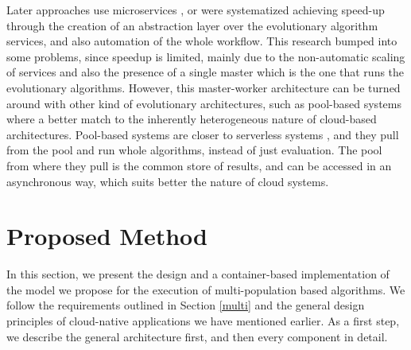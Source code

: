 \documentclass[review]{elsarticle}
\begin{document}
Later approaches use microservices \cite{khalloof2018generic}, or were
systematized \cite{salza2019speed} achieving speed-up through the
creation of an abstraction layer over the evolutionary algorithm
services, and also automation of the whole workflow. This research
bumped into some problems, since speedup is limited, mainly due to the
non-automatic scaling of services and also the presence of a single
master which is the one that runs the evolutionary
algorithms. However, this master-worker architecture can be turned
around with other kind of evolutionary architectures, such
as pool-based systems
\cite{valenzuela2015implementing,merelo2012sofea,sofea:cec2012} where
a better match to the inherently heterogeneous nature of cloud-based
architectures. Pool-based systems are closer to serverless systems
\cite{malawski2017serverless}, and they pull from the pool and run
whole algorithms, instead of just evaluation. The pool from where they
pull is the common store of results, and can be accessed in an
asynchronous way, which suits better the nature of cloud systems.






\section{Proposed Method} 
\label{method} 

In this section, we present the design
and a container-based implementation of the model we propose for the execution
of multi-population based algorithms. We follow the requirements outlined in
Section \ref{multi} and the general design principles of cloud-native
applications we have mentioned earlier. As a first step, we describe the general
architecture first, and then  every component in detail. 
\end{document}
